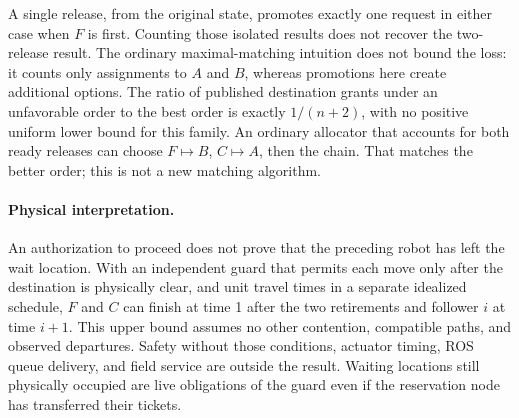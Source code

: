 \documentclass{article}
\begin{document}
A single release, from the original state, promotes exactly one request in either case when \(F\) is first. Counting those isolated results does not recover the two-release result. The ordinary maximal-matching intuition does not bound the loss: it counts only assignments to \(A\) and \(B\), whereas promotions here create additional options. The ratio of published destination grants under an unfavorable order to the best order is exactly \(1/(n+2)\), with no positive uniform lower bound for this family. An ordinary allocator that accounts for both ready releases can choose \(F\mapsto B\), \(C\mapsto A\), then the chain. That matches the better order; this is not a new matching algorithm.

\paragraph{Physical interpretation.}
An authorization to proceed does not prove that the preceding robot has left the wait location. With an independent guard that permits each move only after the destination is physically clear, and unit travel times in a separate idealized schedule, \(F\) and \(C\) can finish at time 1 after the two retirements and follower \(i\) at time \(i+1\). This upper bound assumes no other contention, compatible paths, and observed departures. Safety without those conditions, actuator timing, ROS queue delivery, and field service are outside the result. Waiting locations still physically occupied are live obligations of the guard even if the reservation node has transferred their tickets.
\end{document}

